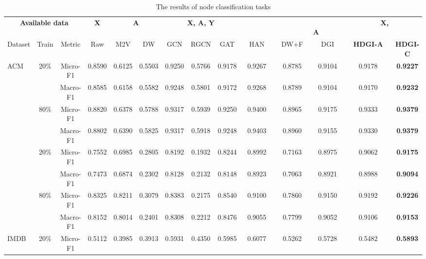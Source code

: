 \documentclass[conference]{IEEEtran}
\begin{document}
\begin{table*}[thb!]
\centering
		
\begin{threeparttable}
			\caption{The results of node classification tasks}
			\begin{tabular}{l|c|c| c| c c|cccc| cccc }
				\toprule
\multicolumn{3}{c}{\textbf{Available data}}&  \multicolumn{1}{c}{\textbf{X}}
				& \multicolumn{2}{c}{\textbf{A}}&\multicolumn{3}{c}{\textbf{X, A, Y}} &\multicolumn{4}{c}{\textbf{\ \ \ \ \ \ \ \ \ \ \ \ \ \ \ \ \ \ \ \ \ \ \ \ \ \ \ \ \ \ \ \ \ \ \ X, A}}  \\
				\cmidrule(l){1-14}
Dataset  & Train & Metric & Raw & M2V & DW  & GCN & RGCN & GAT & HAN & DW+F & DGI & \textbf{HDGI-A} & \textbf{HDGI-C}\\
				\midrule
				\multirow{6}{*}{ACM} & \multirow{2}{*}{20\%} & Micro-F1 & 0.8590 & 0.6125 & 0.5503 & 0.9250 &0.5766 & 0.9178 & 0.9267 & 0.8785 & 0.9104 & 0.9178 & \textbf{0.9227} \\
				\cmidrule(l){3-14}
				& & Macro-F1 & 0.8585 & 0.6158 & 0.5582  & 0.9248 &0.5801 & 0.9172 & 0.9268 & 0.8789 & 0.9104 & 0.9170 & \textbf{0.9232}\\
				\cmidrule(l){2-14}
				& \multirow{2}{*}{80\%} & Micro-F1 & 0.8820 & 0.6378 & 0.5788  & 0.9317 & 0.5939 & 0.9250 & 0.9400 & 0.8965 & 0.9175 & 0.9333 & \textbf{0.9379}\\
				\cmidrule(l){3-14}
				&& Macro-F1 & 0.8802 & 0.6390 & 0.5825  & 0.9317 &0.5918 & 0.9248 & 0.9403 & 0.8960 & 0.9155 & 0.9330 & \textbf{0.9379}\\
				\midrule
				\multirow{6}{*}{DBLP} & \multirow{2}{*}{20\%} & Micro-F1 & 0.7552 & 0.6985 & 0.2805  & 0.8192 &0.1932 & 0.8244 & 0.8992 & 0.7163 & 0.8975 & 0.9062 & \textbf{0.9175}\\
				\cmidrule(l){3-14}
				& & Macro-F1 & 0.7473 & 0.6874 & 0.2302  & 0.8128 &0.2132 & 0.8148 & 0.8923 & 0.7063 & 0.8921 & 0.8988 & \textbf{0.9094}\\
				\cmidrule(l){2-14}
				& \multirow{2}{*}{80\%} & Micro-F1 & 0.8325 & 0.8211 & 0.3079  & 0.8383 &0.2175 & 0.8540 & 0.9100 & 0.7860 & 0.9150 & 0.9192 & \textbf{0.9226}\\
				\cmidrule(l){3-14}
				&& Macro-F1 & 0.8152 & 0.8014 & 0.2401  & 0.8308 &0.2212 & 0.8476 & 0.9055 & 0.7799 & 0.9052 & 0.9106 & \textbf{0.9153}\\
				\midrule
				\multirow{6}{*}{IMDB} & \multirow{2}{*}{20\%} & Micro-F1 & 0.5112 & 0.3985 & 0.3913 & 0.5931 &0.4350 & 0.5985 & 0.6077 & 0.5262 & 0.5728 & 0.5482 & \textbf{0.5893} \\

\end{tabular}
\end{threeparttable}
\end{table*}
\end{document}
